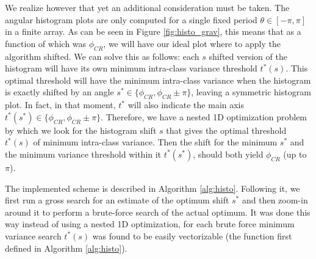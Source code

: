 \documentclass[11pt, a4paper, twoside]{article} %
\begin{document}
We realize however that yet an additional consideration must be taken. The angular histogram plots are only computed for a single fixed period $\theta\in[-\pi,\pi]$ in a finite array. As can be seen in Figure \ref{fig:histo_grav}, this means that as a function of which was $\phi_{CR}$, we will have our ideal plot where to apply the algorithm shifted. We can solve this as follows: each $s$ shifted version of the histogram will have its own minimum intra-class variance threshold $t^*(s)$. This optimal threshold will have the minimum intra-class variance when the histogram is exactly shifted by an angle $s^*\in\{\phi_{CR},\phi_{CR}\pm\pi\}$, leaving a symmetric histogram plot. In fact, in that moment, $t^*$ will also indicate the main axis $t^*(s^*)\in\{\phi_{CR},\phi_{CR}\pm\pi\}$. Therefore, we have a nested 1D optimization problem by which we look for the histogram shift $s$ that gives the optimal threshold $t^*(s)$ of minimum intra-class variance. Then the shift for the minimum $s^*$ and the minimum variance threshold within it $t^*(s^*)$, should both yield $\phi_{CR}$ (up to $\pi$).

The implemented scheme is described in Algorithm \ref{alg:histo}. Following it, we first run a gross search for an estimate of the optimum shift $s^*$ and then zoom-in around it to perform a brute-force search of the actual optimum. It was done this way instead of using a nested 1D optimization, for each brute force minimum variance search $t^*(s)$ was found to be easily vectorizable (the function first defined in Algorithm \ref{alg:histo}).
\end{document}
